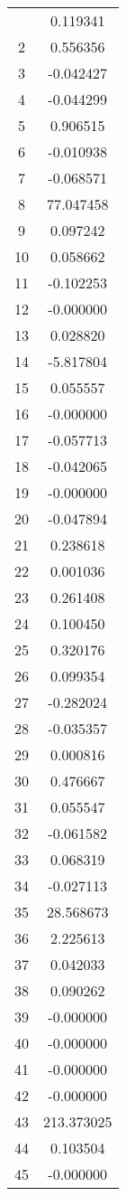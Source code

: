 \documentclass[12pt]{article}
\begin{document}
\begin{longtable}{@{}cc@{}}
\bottomrule
\endlastfoot
1 & 0.119341 \\
2 & 0.556356 \\
3 & -0.042427 \\
4 & -0.044299 \\
5 & 0.906515 \\
6 & -0.010938 \\
7 & -0.068571 \\
8 & 77.047458 \\
9 & 0.097242 \\
10 & 0.058662 \\
11 & -0.102253 \\
12 & -0.000000 \\
13 & 0.028820 \\
14 & -5.817804 \\
15 & 0.055557 \\
16 & -0.000000 \\
17 & -0.057713 \\
18 & -0.042065 \\
19 & -0.000000 \\
20 & -0.047894 \\
21 & 0.238618 \\
22 & 0.001036 \\
23 & 0.261408 \\
24 & 0.100450 \\
25 & 0.320176 \\
26 & 0.099354 \\
27 & -0.282024 \\
28 & -0.035357 \\
29 & 0.000816 \\
30 & 0.476667 \\
31 & 0.055547 \\
32 & -0.061582 \\
33 & 0.068319 \\
34 & -0.027113 \\
35 & 28.568673 \\
36 & 2.225613 \\
37 & 0.042033 \\
38 & 0.090262 \\
39 & -0.000000 \\
40 & -0.000000 \\
41 & -0.000000 \\
42 & -0.000000 \\
43 & 213.373025 \\
44 & 0.103504 \\
45 & -0.000000 \\

\end{longtable}
\end{document}
